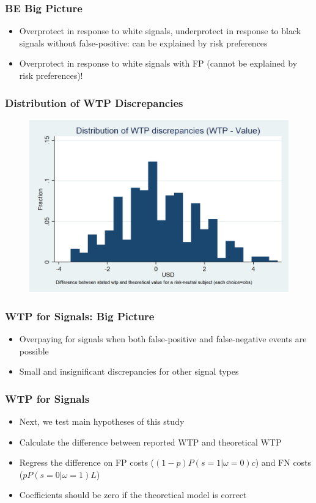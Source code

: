 \documentclass[11pt,hyperref={bookmarks=false}]{beamer}
\begin{document}
\begin{frame}
\frametitle{BE Big Picture}
\begin{itemize}
\item Overprotect in response to white signals, underprotect in response to black signals without false-positive: can be explained by risk preferences
\item Overprotect in response to white signals with FP (cannot be explained by risk preferences)!
\end{itemize}
\scriptsize

\end{frame}



\begin{frame}
\frametitle{Distribution of WTP Discrepancies}
\begin{figure}[h]
\includegraphics[scale=0.2]{Graphs/hist_WTP_discr1.png}
\end{figure}
\end{frame}





\begin{frame}
\frametitle{WTP for Signals: Big Picture}
\begin{itemize}
\item Overpaying for signals when both false-positive and false-negative events are possible
\item Small and insignificant discrepancies for other signal types
\end{itemize}
\small

\end{frame}


\begin{frame}
\frametitle{WTP for Signals}
\begin{itemize}
\item Next, we test main hypotheses of this study
\item Calculate the difference between reported WTP and theoretical WTP
\item Regress the difference on FP costs ($(1-p)P(s=1|\omega=0)c$) and FN costs ($pP(s=0|\omega=1)L$)
\item Coefficients should be zero if the theoretical model is correct
\end{itemize}
\end{frame}
\end{document}
